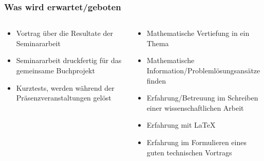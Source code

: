 %
%
%
\bgroup
\begin{frame}[t]
\setlength{\abovedisplayskip}{5pt}
\setlength{\belowdisplayskip}{5pt}
\frametitle{Was wird erwartet/geboten}
\vspace{-20pt}
\begin{columns}[t,onlytextwidth]
\begin{column}{0.48\textwidth}
\begin{itemize}
\item<2-> Vortrag über die Resultate der Seminararbeit
\item<3-> Seminararbeit druckfertig für das gemeinsame Buchprojekt
\item<4-> Kurztests, werden während der Präsenzveranstaltungen gelöst
\end{itemize}
\end{column}
\begin{column}{0.48\textwidth}
\begin{itemize}
\item<5-> Mathematische Vertiefung in ein Thema
\item<6-> Mathematische Information/Problemlösungsansätze finden
\item<7-> Erfahrung/Betreuung im Schreiben einer wissenschaftlichen Arbeit
\item<7-> Erfahrung mit \LaTeX
\item<7-> Erfahrung im Formulieren eines guten technischen Vortrags
\end{itemize}
\end{column}
\end{columns}
\end{frame}
\egroup
